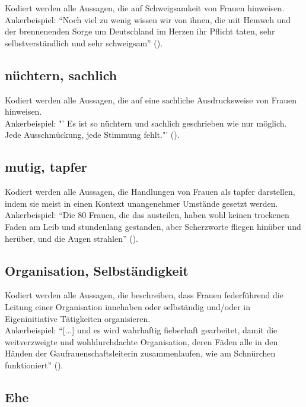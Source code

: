 \documentclass[12pt, titlepage=true, toc=bib]{scrartcl}
\begin{document}
Kodiert werden alle Aussagen, die auf Schweigsamkeit von Frauen hinweisen.\\
Ankerbeispiel: "`Noch viel zu wenig wissen wir von ihnen, die mit Hemweh und der brennenenden Sorge um Deutschland im Herzen ihr Pflicht taten, sehr selbstverständlich und sehr schweigsam"' (\cite[669]{maltzahn_deutsche_1936}).

\subsection*{nüchtern, sachlich}

Kodiert werden alle Aussagen, die auf eine sachliche Ausdrucksweise von Frauen hinweisen.\\
Ankerbeispiel: "' Es ist so nüchtern und sachlich geschrieben wie nur möglich. Jede Ausschmückung, jede Stimmung fehlt."' (\cite[669]{maltzahn_deutsche_1936}).

\subsection*{mutig, tapfer}

Kodiert werden alle Aussagen, die Handlungen von Frauen als tapfer darstellen, indem sie meist in einen Kontext unangenehmer Umstände gesetzt werden.\\
Ankerbeispiel: "`Die 80 Frauen, die das austeilen, haben wohl keinen trockenen Faden am Leib und stundenlang gestanden, aber Scherzworte fliegen hinüber und herüber, und die Augen strahlen"' (\cite[775]{a._v._s._kameradschaft_1936}).

\subsection*{Organisation, Selbständigkeit}

Kodiert werden alle Aussagen, die beschreiben, dass Frauen federführend die Leitung einer Organisation innehaben oder selbständig und/oder in Eigeninitiative Tätigkeiten organisieren.\\
Ankerbeispiel: "`[...] und es wird wahrhaftig fieberhaft gearbeitet, damit die weitverzweigte und wohldurchdachte Organisation, deren Fäden alle in den Händen der Gaufrauenschaftsleiterin zusammenlaufen, wie am Schnürchen funktioniert"' (\cite[778]{a_v._s._kameradschaft_1936}).

\subsection*{Ehe}
\end{document}
